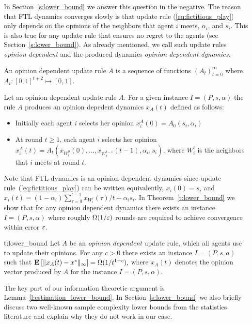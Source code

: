 In Section~\ref{s:lower_bound} we answer this question in the negative.
The reason that FTL dynamics converges slowly is that
update rule (\ref{eq:fictitious_play})
only depends on the opinions of the neighbors that agent $i$ meets,
$\alpha_i$, and $s_i$. This is also true for any update rule that
ensures no regret to the agents (see Section~\ref{s:lower_bound}).
As already mentioned, we call such update rules \emph{opinion dependent}
and the produced dynamics \emph{opinion dependent dynamics}.

\begin{definition}\label{d:opinion_dependent_dynamics}
An opinion dependent update rule $A$ is a sequence of
functions $(A_t)_{t=0}^\infty$ where
$A_t: [0,1]^{t+2}\mapsto [0,1]$.
\end{definition}

\begin{definition}\label{d:opinion_dependent_dynamics}
Let an opinion dependent update rule $A$. For a given instance $I=(P,s,\alpha)$
the rule $A$ produces an opinion depedent dynamics $x_A(t)$ defined as follows:
\begin{itemize}
 \item Initially each agent $i$ selects her opinion $x_i^A(0)=A_0(s_i,\alpha_i)$
 \item At round $t\geq 1$, each agent $i$ selects her opinion
   \(x_i^A(t)=A_t(x_{W_i^0}(0),\dots,x_{W_i^{t-1}}(t-1),\alpha_i,s_i)\),
where $W_i^t$ is the neighbors that $i$ meets at round $t$.
\end{itemize}
\end{definition}

Note that FTL dynamics is an opinion dependent dynamics
since update rule~(\ref{eq:fictitious_play}) can
be written equivalently, $x_i(0)=s_i$ and $x_i(t)=(1-\alpha_i)\sum_{\tau=0}^{t-1}x_{W_i^\tau}(\tau)/t + \alpha_i s_i$.
In Theorem~\ref{t:lower_bound} we show that for any opinion dependent dynamics
there exists an instance $I = (P,s,\alpha)$ where roughly $\Omega(1/\varepsilon)$
rounds are required to achieve convergence within error $\varepsilon$.
\begin{reptheorem}{t:lower_bound}
  Let $A$ be an \emph{opinion dependent} update rule, which all agents use to
  update their opinions.  For any $c>0$ there exists an instance $I=(P,s,a)$
  such that
  \(
    \Exp{\norm{\infty}{x_A(t) - x^*}} = \Omega(1/t^{1+c}),
  \)
  where $x_A(t)$ denotes the opinion vector produced by $A$ for the instance
  $I=(P,s,\alpha)$.
\end{reptheorem}
%
The key part of our information theoretic argument is Lemma~\ref{l:estimation_lower_bound}.
In Section~\ref{s:lower_bound} we also briefly discuss two well-known sample
complexity lower bounds from the statistics literature and explain why they do
not work in our case.

